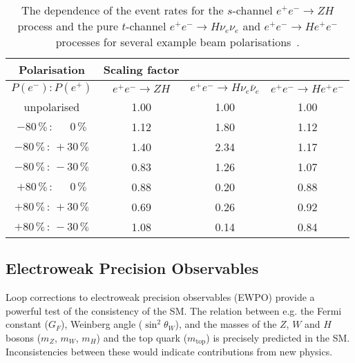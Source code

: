 \documentclass[../report.tex]{subfiles}
\providecommand{\main}{..}
\newcommand{\ew}{electroweak\xspace}
\newcommand{\epem}{e^{+}e^{-}}
\begin{document}
\begin{table}[tb]
\caption{The dependence of the event rates for the $s$-channel
$\epem\to Z H$ process and the pure $t$-channel
$\epem\to H \nu_e \nu_e$ and $\epem\to H\epem$ processes for several
example beam polarisations~\cite{Abramowicz:2016zbo}.
\label{tab:higgs:polarisation}}
\begin{center}
  \begin{tabular}{cccc}
    Polarisation                              & Scaling factor                 &&       \\
\hline
    $P(e^{-}):P(e^{+})$                  &
    $\epem \!\to ZH$ &
    $\epem \to H\nu_e \bar{\nu}_e$ &
    $\epem \to H\epem$ \\
    unpolarised                                  & 1.00                & 1.00        &   1.00        \\
    $-80\,\%\,:\phantom{+3}\,0\,\%$   & 1.12                & 1.80        &    1.12             \\
    $-80\,\%\,:\,+30\,\%$                    & 1.40                & 2.34        &    1.17           \\
    $-80\,\%\,:\,-30\,\%$                    & 0.83                & 1.26        &    1.07           \\
    $+80\,\%\,:\phantom{+3}\,0\,\%$  & 0.88                & 0.20        &    0.88             \\
    $+80\,\%\,:\,+30\,\%$                    & 0.69                & 0.26        &    0.92           \\

    $+80\,\%\,:\,-30\,\%$                    & 1.08                & 0.14        &    0.84           \\
\hline
\end{tabular}
\end{center}
\end{table}



\subsection{Electroweak Precision Observables}
Loop corrections to \ew precision observables (EWPO) provide a powerful test of the consistency of the SM. The relation between e.g. the  Fermi constant ($G_F$), Weinberg angle ($\sin^2\theta_W$), and the masses of the $Z$, $W$ and $H$ bosons ($m_Z$, $m_W$, $m_H$) and the top quark ($m_\textrm{top}$) is precisely predicted in the SM. Inconsistencies between these would indicate contributions from new physics.
\end{document}
